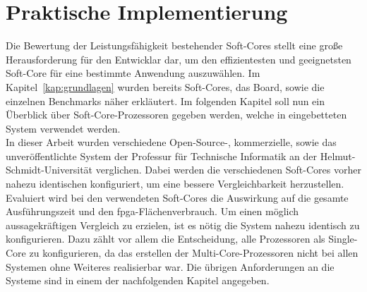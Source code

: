 %
%
%
%

\chapter{Praktische Implementierung}\label{kap:implementierung}
Die Bewertung der Leistungsfähigkeit bestehender Soft-Cores stellt eine große Herausforderung für den Entwicklar dar, um den effizientesten und geeignetsten Soft-Core
für eine bestimmte Anwendung auszuwählen. Im Kapitel~\ref{kap:grundlagen} wurden bereits Soft-Cores, das Board, sowie die einzelnen Benchmarks näher erkläutert. Im folgenden Kapitel
soll nun ein Überblick über Soft-Core-Prozessoren gegeben werden, welche in eingebetteten System verwendet werden. \\
In dieser Arbeit wurden verschiedene Open-Source-, kommerzielle, sowie das unveröffentlichte System der Professur für Technische Informatik an der Helmut-Schmidt-Universität verglichen.
Dabei werden die verschiedenen Soft-Cores vorher nahezu identischen konfiguriert, um eine bessere Vergleichbarkeit herzustellen. Evaluiert wird bei den verwendeten Soft-Cores
die Auswirkung auf die gesamte Ausführungszeit und den \ac{fpga}-Flächenverbrauch. Um einen möglich aussagekräftigen Vergleich zu erzielen, ist es nötig die System nahezu identisch zu
konfigurieren. Dazu zählt vor allem die Entscheidung, alle Prozessoren als Single-Core zu konfigurieren, da das erstellen der Multi-Core-Prozessoren nicht bei allen Systemen ohne Weiteres
realisierbar war. Die übrigen Anforderungen an die Systeme sind in einem der nachfolgenden Kapitel angegeben.\\

